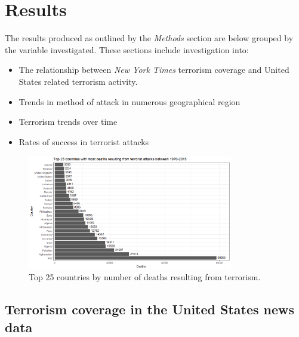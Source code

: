 \documentclass[10pt,a4paper]{article}
\begin{document}
\section{Results}
The results produced as outlined by the \textit{Methods} section are below grouped by the variable investigated. These sections include investigation into:\\
\begin{itemize}
\item The relationship between \textit{New York Times} terrorism coverage and United States related terrorism activity.
\item Trends in method of attack in numerous geographical region
\item Terrorism trends over time
\item Rates of success in terrorist attacks 

\end{itemize}

\begin{center}
\begin{figure}[H]		
	\includegraphics[width=0.8\textwidth]{Plots/Top25countriesbydeaths.png}
	\caption{Top 25 countries by number of deaths resulting from terrorism.}
\end{figure}
\end{center}

\subsection{Terrorism coverage in the United States news data}
\end{document}
